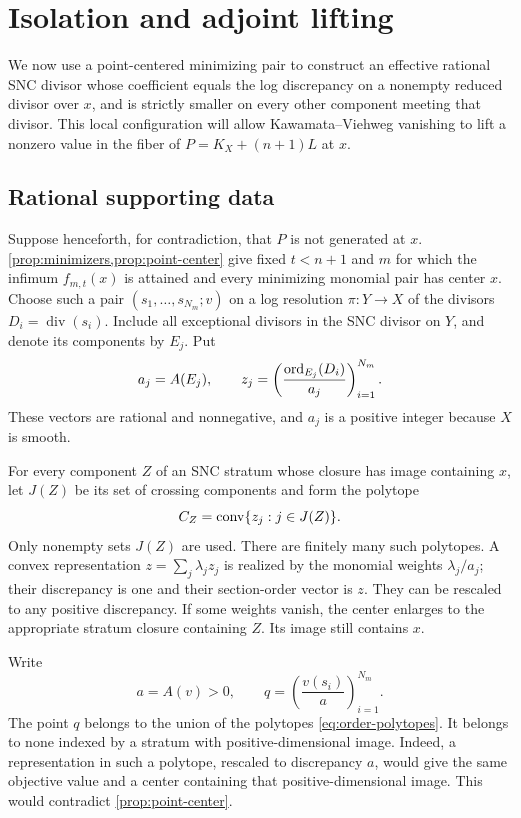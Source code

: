 \section{Isolation and adjoint lifting}
\label{sec:isolation}

We now use a point-centered minimizing pair to construct an effective rational SNC divisor whose coefficient equals the log discrepancy on a nonempty reduced divisor over $x$, and is strictly smaller on every other component meeting that divisor. This local configuration will allow Kawamata--Viehweg vanishing to lift a nonzero value in the fiber of $P=K_X+(n+1)L$ at $x$.

\subsection{Rational supporting data}

Suppose henceforth, for contradiction, that $P$ is not generated at $x$.  \cref{prop:minimizers,prop:point-center} give fixed $t<n+1$ and $m$ for which the infimum $f_{m,t}(x)$ is attained and every minimizing monomial pair has center $x$.  Choose such a pair $(s_1,\ldots,s_{N_m};v)$ on a log resolution $\pi:Y\to X$ of the divisors $D_i=\operatorname{div}(s_i)$.  Include all exceptional divisors in the SNC divisor on $Y$, and denote its components by $E_j$. Put
\[
 a_j={A}(E_j),\qquad
 z_j=\left(\frac{\operatorname{ord}_{E_j}(D_i)}{a_j}\right)_{i=1}^{N_m}.
\]
These vectors are rational and nonnegative, and $a_j$ is a positive integer because $X$ is smooth.

For every component $Z$ of an SNC stratum whose closure has image containing $x$, let $J(Z)$ be its set of crossing components and form the polytope
\begin{equation}
 C_Z=\operatorname{conv}\{z_j:j\in J(Z)\}.
 \label{eq:order-polytopes}
\end{equation}
Only nonempty sets $J(Z)$ are used.  There are finitely many such polytopes.  A convex representation $z=\sum_j\lambda_jz_j$ is realized by the monomial weights $\lambda_j/a_j$; their discrepancy is one and their section-order vector is $z$.  They can be rescaled to any positive discrepancy.  If some weights vanish, the center enlarges to the appropriate stratum closure containing $Z$. Its image still contains $x$.

Write
\[
 a={A}(v)>0,
 \qquad q=\left(\frac{v(s_i)}a\right)_{i=1}^{N_m}.
\]
The point $q$ belongs to the union of the polytopes \eqref{eq:order-polytopes}.  It belongs to none indexed by a stratum with positive-dimensional image.  Indeed, a representation in such a polytope, rescaled to discrepancy $a$, would give the same objective value and a center containing that positive-dimensional image.  This would contradict \cref{prop:point-center}.


